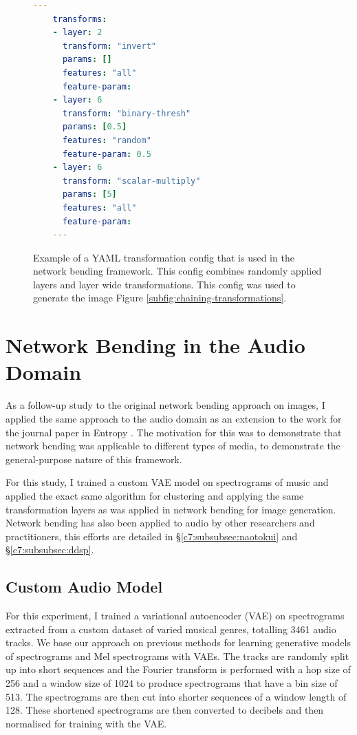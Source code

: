  \begin{figure}[!htb]
 \begin{lstlisting}[language=yaml]
    ---
    transforms:
    - layer: 2
      transform: "invert"
      params: []
      features: "all"
      feature-param: 
    - layer: 6
      transform: "binary-thresh"
      params: [0.5]
      features: "random"
      feature-param: 0.5
    - layer: 6
      transform: "scalar-multiply"
      params: [5]
      features: "all"
      feature-param: 
    ---
    \end{lstlisting}
    \caption[Example YAML transformation config]{Example of a YAML transformation config that is used in the network bending framework. This config combines randomly applied layers and layer wide transformations. This config was used to generate the image Figure \ref{subfig:chaining-transformations}.}
    \label{fig:c5:yaml-transform-config}
 \end{figure}

\section{Network Bending in the Audio Domain}
\label{c5:sec:net-bend-audio}

As a follow-up study to the original network bending approach on images, I applied the same approach to the audio domain as an extension to the work for the journal paper in Entropy \citep{broad2022network}. 
The motivation for this was to demonstrate that network bending was applicable to different types of media, to demonstrate the general-purpose nature of this framework. 

For this study, I trained a custom VAE model on spectrograms of music and applied the exact same algorithm for clustering and applying the same transformation layers as was applied in network bending for image generation. 
Network bending has also been applied to audio by other researchers and practitioners, this efforts are detailed in \S \ref{c7:subsubsec:naotokui} and \S \ref{c7:subsubsec:ddsp}.

\subsection{Custom Audio Model}

For this experiment, I trained a variational autoencoder (VAE) \citep{kingma2013auto,rezende2014stochastic} on spectrograms extracted from a custom dataset of varied musical genres, totalling 3461 audio tracks. We base our approach on previous methods for learning generative models of spectrograms \citep{akten2018granma} and Mel spectrograms \citep{valenzuela2021melspecvae} with VAEs. The tracks are randomly split up into short sequences and the Fourier transform is performed with a hop size of 256 and a window size of 1024 to produce spectrograms that have a bin size of 513. The spectrograms are then cut into shorter sequences of a window length of 128. These shortened spectrograms are then converted to decibels and then normalised for training with the VAE.  

